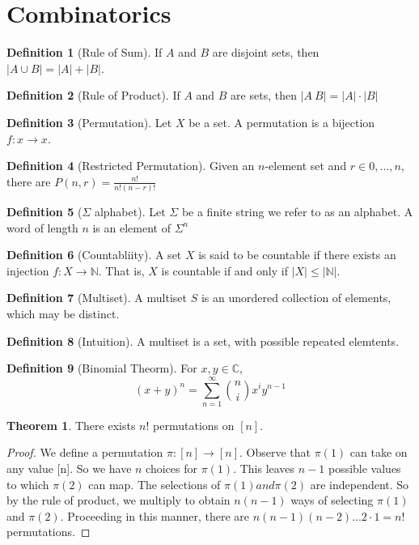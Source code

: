 \documentclass{article}
\theoremstyle{definition}
\newtheorem{define}{Definition}[section]
\newtheorem{thm}{Theorem}[section]
\begin{document}
\section{Combinatorics}

\begin{define}[Rule of Sum]
If $A$ and $B$ are disjoint sets, then $|A \cup B| = |A| +|B|$.
\end{define}

\begin{define}[Rule of Product]
If $A$ and $B$ are sets, then $|A\ B|=|A| \cdot |B|$
\end{define}

\begin{define}[Permutation]
Let $X$ be a set. A permutation is a bijection $f: x \rightarrow x$.
\end{define}

\begin{define}[Restricted Permutation]
Given an $n$-element set and $r \in {0,...,n}$, there are $P(n,r)= \frac{n!}{n!(n-r)!}$
\end{define}

\begin{define}[$\Sigma$ alphabet]
Let $\Sigma$ be a finite string we refer to as an alphabet. A word of length $n$ is an element of $\Sigma ^n$
\end{define}

\begin{define}[Countabliity]
A set $X$ is said to be countable if there exists an injection $f: X \rightarrow \mathbb{N}$. That is, $X$ is countable if and only if $|X| \leq |\mathbb{N}|$.
\end{define}

\begin{define}[Multiset]
A multiset $S$ is an unordered collection of elements, which may be distinct.
\end{define}

\begin{define}[Intuition]
A multiset is a set, with possible repeated elemtents.
\end{define}

\begin{define}[Binomial Theorm]
For $x,y \in \mathbb{C}$, $$(x+y)^n = {\sum_{n=1}^{\infty}}{{n}\choose{i}}x^{i}y^{n-1}$$
\end{define}

\begin{thm}
There exists $n!$ permutations on $[n]$.
\end{thm}
\begin{proof}We define a permutation $\pi: [n] \rightarrow [n]$. Observe that $\pi(1)$ can take on any value [n]. So we have $n$ choices for $\pi(1)$. This leaves $n-1$ possible values to which $\pi(2)$ can map. The selections of $\pi(1) and \pi(2)$ are independent. So by the rule of product, we multiply to obtain $n(n-1)$ ways of selecting $\pi (1)$ and $\pi(2)$. Proceeding in this manner, there are $n(n-1)(n-2)...2 \cdot 1 = n!$ permutations.
\end{proof}
\end{document}
